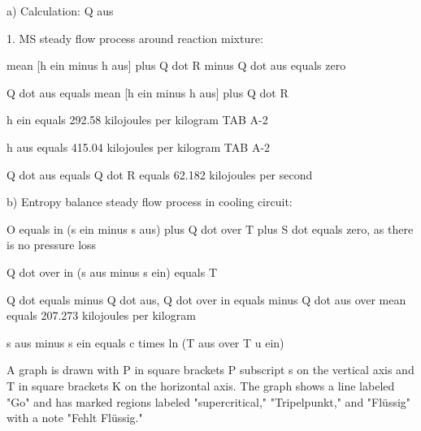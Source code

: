a) Calculation: Q aus

1. MS steady flow process around reaction mixture:

mean [h ein minus h aus] plus Q dot R minus Q dot aus equals zero

Q dot aus equals mean [h ein minus h aus] plus Q dot R

h ein equals 292.58 kilojoules per kilogram TAB A-2

h aus equals 415.04 kilojoules per kilogram TAB A-2

Q dot aus equals Q dot R equals 62.182 kilojoules per second

b) Entropy balance steady flow process in cooling circuit:

O equals in (s ein minus s aus) plus Q dot over T plus S dot equals zero, as there is no pressure loss

Q dot over in (s aus minus s ein) equals T

Q dot equals minus Q dot aus, Q dot over in equals minus Q dot aus over mean equals 207.273 kilojoules per kilogram

s aus minus s ein equals c times ln (T aus over T u ein)

A graph is drawn with P in square brackets P subscript s on the vertical axis and T in square brackets K on the horizontal axis. The graph shows a line labeled "Go" and has marked regions labeled "supercritical," "Tripelpunkt," and "Flüssig" with a note "Fehlt Flüssig."